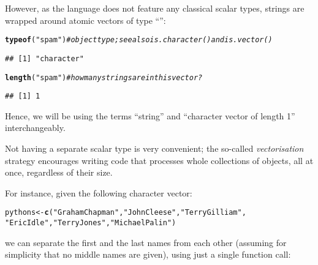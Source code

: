 \documentclass[nojss]{jss}\usepackage[]{graphicx}\usepackage[]{xcolor}
\makeatletter
\newcommand{\hlstr}[1]{\textcolor[rgb]{0.192,0.494,0.8}{#1}}%
\newcommand{\hlcom}[1]{\textcolor[rgb]{0.678,0.584,0.686}{\textit{#1}}}%
\newcommand{\hlstd}[1]{\textcolor[rgb]{0.345,0.345,0.345}{#1}}%
\newcommand{\hlkwb}[1]{\textcolor[rgb]{0.69,0.353,0.396}{#1}}%
\newcommand{\hlkwd}[1]{\textcolor[rgb]{0.737,0.353,0.396}{\textbf{#1}}}%
\newenvironment{kframe}{%
 \def\at@end@of@kframe{}%
 \ifinner\ifhmode%
  \def\at@end@of@kframe{\end{minipage}}%
  \begin{minipage}{\columnwidth}%
 \fi\fi%
 \def\FrameCommand##1{\hskip\@totalleftmargin \hskip-\fboxsep
 \colorbox{shadecolor}{##1}\hskip-\fboxsep
     \hskip-\linewidth \hskip-\@totalleftmargin \hskip\columnwidth}%
 \MakeFramed {\advance\hsize-\width
   \@totalleftmargin\z@ \linewidth\hsize
   \@setminipage}}%
 {\par\unskip\endMakeFramed%
 \at@end@of@kframe}
\newenvironment{knitrout}{}{} %
\makeatother
\begin{document}
However, as the   language does not feature any
classical scalar types, strings are wrapped around atomic vectors
of type ``'':

\begin{knitrout}
\color{fgcolor}\begin{kframe}
\begin{alltt}
\hlkwd{typeof}\hlstd{(}\hlstr{"spam"}\hlstd{)}  \hlcom{# object type; see also is.character() and is.vector()}
\end{alltt}
\begin{verbatim}
## [1] "character"
\end{verbatim}
\begin{alltt}
\hlkwd{length}\hlstd{(}\hlstr{"spam"}\hlstd{)}  \hlcom{# how many strings are in this vector?}
\end{alltt}
\begin{verbatim}
## [1] 1
\end{verbatim}
\end{kframe}
\end{knitrout}

\noindent
Hence, we will be using the terms ``string'' and ``character vector
of length 1'' interchangeably.

Not having a separate scalar type is very convenient; the so-called
\emph{vectorisation} strategy encourages writing code that
processes whole collections of objects, all at once,
regardless of their size.

For instance, given the following character vector:


\begin{knitrout}
\color{fgcolor}\begin{kframe}
\begin{alltt}
\hlstd{pythons} \hlkwb{<-} \hlkwd{c}\hlstd{(}\hlstr{"Graham Chapman"}\hlstd{,} \hlstr{"John Cleese"}\hlstd{,} \hlstr{"Terry Gilliam"}\hlstd{,}
  \hlstr{"Eric Idle"}\hlstd{,} \hlstr{"Terry Jones"}\hlstd{,} \hlstr{"Michael Palin"}\hlstd{)}
\end{alltt}
\end{kframe}
\end{knitrout}

\noindent
we can separate the first and the last names from
each other (assuming for simplicity that no middle names are given),
using just a single function call:
\end{document}
